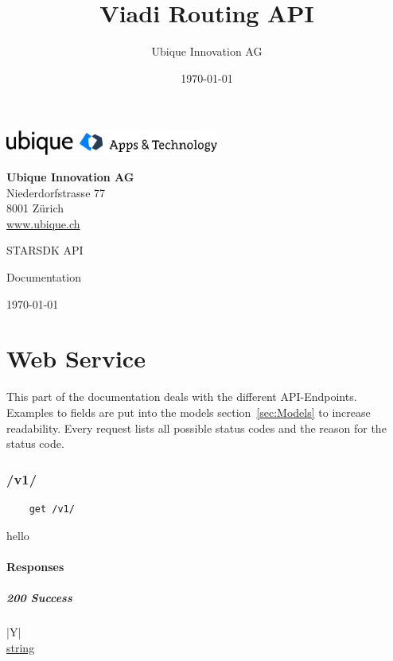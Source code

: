 \documentclass[a4paper
]{ubarticle}
\title{Viadi Routing API}
\date{\today}
\author{Ubique Innovation AG}
\begin{document}
\begin{titlepage}
	\includegraphics[width=7cm]{ubique-logo.png}
	\hspace{4.3cm}
 {\raggedleft
	 \textbf{Ubique Innovation AG} \\
	\hspace{11.5cm} Niederdorfstrasse 77 \\
	8001 Zürich \\
\vspace{0.3cm}
	\url{www.ubique.ch } 
\par}
	\vspace{3cm}
	{\Huge STARSDK API \par}
	\vspace{1.5cm}
	{\huge Documentation \par}
	\vspace{3cm}
	{ \large \today }
	\end{titlepage}
\thispagestyle{empty}
\clearpage
\tableofcontents
\clearpage

\part{Web Service}
This part of the documentation deals with the different API-Endpoints. Examples to fields are put into the models section~\ref{sec:Models} to increase readability. Every request lists all possible status codes and the reason for the status code.
\section{ /v1/ }
    \begin{verbatim}
    get /v1/
    \end{verbatim}
hello

\subsection{Responses}
\subsubsection{ 200 Success }
 

    
        \begin{ubresponses}{\textwidth}{|Y|}
        \\
        \hline
             \hyperref[sec:string] { string } \\
 \hline

        \end{ubresponses}
    
\end{document}
